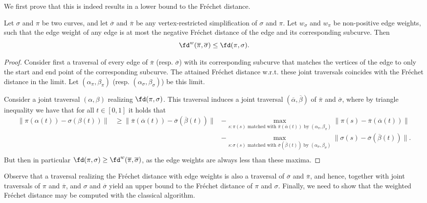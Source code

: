 We first prove that this is indeed results in a lower bound to the Fréchet distance.

\begin{lemma}\label{lem:weightedLowerbound}
    Let $\sigma$ and $\pi$ be two curves, and let $\overline{\sigma}$ and $\overline{\pi}$ be any vertex-restricted simplification of $\sigma$ and $\pi$. Let $w_\sigma$ and $w_\pi$ be non-positive edge weights, such that the edge weight of any edge is at most the negative Fréchet distance of the edge and its corresponding subcurve. Then
    \[\fd^w(\overline{\pi},\overline{\sigma})\leq \fd(\pi,\sigma).\]
\end{lemma}
\begin{proof}
    Consider first a traversal of every edge of $\overline{\pi}$ (resp. $\overline{\sigma}$) with its corresponding subcurve that matches the vertices  of the edge to only the start and end point of the corresponding subcurve. The attained Fréchet distance w.r.t. these joint traversals coincides with the Fréchet distance in the limit. Let $(\alpha_\pi,\beta_\pi)$ (resp. $(\alpha_\sigma,\beta_\sigma)$) be this limit.
    
    Consider a joint traversal $(\alpha,\beta)$ realizing $\fd(\pi,\sigma)$. This traversal induces a joint traversal $(\overline{\alpha},\overline{\beta})$ of $\overline{\pi}$ and $\overline{\sigma}$, where by triangle inequality we have that for all $t\in[0,1]$ it holds that
    \begin{align*}
        \|\pi(\alpha(t)) - \sigma(\beta(t))\|&\geq \|\overline{\pi}(\overline{\alpha}(t)) - \overline{\sigma}(\overline{\beta}(t))\| &- \max_{s:\pi(s)\text{ matched with }\overline{\pi}(\overline{\alpha}(t))\text{ by }(\alpha_\pi,\beta_\pi)}\|\pi(s) - \overline{\pi}(\overline{\alpha}(t))\|\\
        &  &- \max_{s:\sigma(s)\text{ matched with }\overline{\sigma}(\overline{\beta}(t))\text{ by }(\alpha_\sigma,\beta_\sigma)}\|\sigma(s) - \overline{\sigma}(\overline{\beta}(t))\|.\\
    \end{align*}
    But then in particular $\fd(\pi,\sigma)\geq \fd^w(\overline{\pi},\overline{\sigma})$, as the edge weights are always less than these maxima.
\end{proof}

Observe that a traversal realizing the Fréchet distance with edge weights is also a traversal of $\overline{\sigma}$ and $\overline{\pi}$, and hence, together with joint traversals of $\pi$ and $\overline{\pi}$, and $\sigma$ and $\overline{\sigma}$ yield an upper bound to the Fréchet distance of $\pi$ and $\sigma$. Finally, we need to show that the weighted Fréchet distance may be computed with the classical algorithm.

